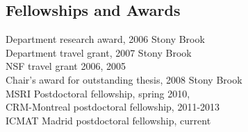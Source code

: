 \documentclass[overlapped,line,letterpaper]{res}
\begin{document}
\begin{resume}
\section{\sc Fellowships and Awards}
Department research award, 2006 Stony Brook\\
Department travel grant, 2007 Stony Brook\\
NSF travel grant 2006, 2005 \\
Chair's award for outstanding thesis, 2008 Stony Brook\\
MSRI Postdoctoral fellowship, spring 2010,\\
CRM-Montreal postdoctoral fellowship,  2011-2013\\ ICMAT Madrid
postdoctoral fellowship, current 

\end{resume}
\end{document}
